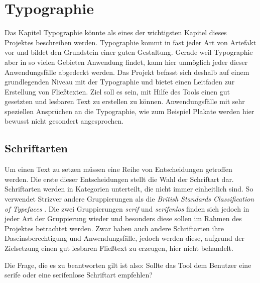 
\chapter{Typographie} %

\label{Typographie} %



Das Kapitel Typographie könnte als eines der wichtigsten Kapitel dieses Projektes beschreiben werden. Typographie kommt in fast jeder Art von Artefakt vor und bildet den Grundstein einer guten Gestaltung. Gerade weil Typographie aber in so vielen Gebieten Anwendung findet, kann hier unmöglich jeder dieser Anwendungsfälle abgedeckt werden.
Das Projekt befasst sich deshalb auf einem grundlegenden Niveau mit der Typographie und bietet einen Leitfaden zur Erstellung von Fließtexten. Ziel soll es sein, mit Hilfe des Tools einen gut gesetzten und lesbaren Text zu erstellen zu können.
Anwendungsfälle mit sehr speziellen Ansprüchen an die Typographie, wie zum Beispiel Plakate werden hier bewusst nicht gesondert angesprochen.

\section{Schriftarten}
Um einen Text zu setzen müssen eine Reihe von Entscheidungen getroffen werden. Die erste dieser Entscheidungen stellt die Wahl der Schriftart dar.
Schriftarten werden in Kategorien unterteilt, die nicht immer einheitlich sind. So verwendet Strizver \cite{strizver2014type} andere Gruppierungen als  die \textit{British Standards Classification of Typefaces} \cite[S. 51]{baines2005type}. Die zwei Gruppierungen \textit{serif} und \textit{serifenlos} finden sich jedoch in jeder Art der Gruppierung wieder und besonders diese sollen im Rahmen des Projektes betrachtet werden.
Zwar haben auch andere Schriftarten ihre Daseinsberechtigung und Anwendungsfälle, jedoch werden diese, aufgrund der Zielsetzung einen gut lesbaren Fließtext zu erzeugen, hier nicht behandelt.

Die Frage, die es zu beantworten gilt ist also: Sollte das Tool dem Benutzer eine serife oder eine serifenlose Schriftart empfehlen?

